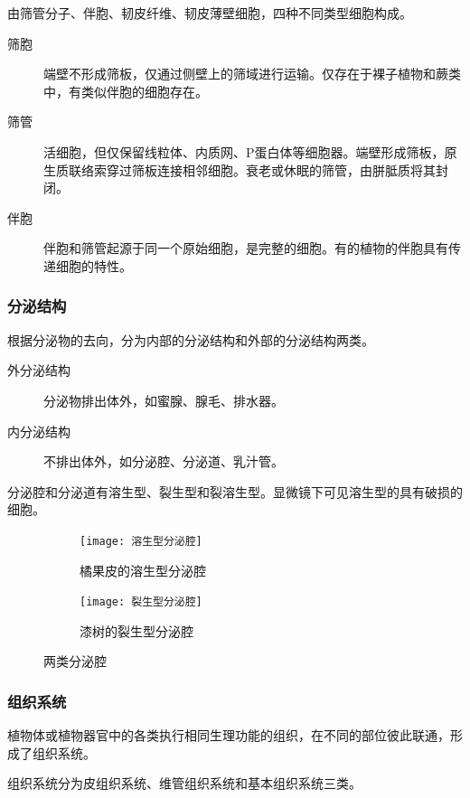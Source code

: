 由筛管分子、伴胞、韧皮纤维、韧皮薄壁细胞，四种不同类型细胞构成。

\begin{description}
	\item[筛胞] 端壁不形成筛板，仅通过侧壁上的筛域进行运输。仅存在于裸子植物和蕨类中，有类似伴胞的细胞存在。
	\item[筛管] 活细胞，但仅保留线粒体、内质网、P蛋白体等细胞器。端壁形成筛板，原生质联络索穿过筛板连接相邻细胞。衰老或休眠的筛管，由胼胝质将其封闭。
	\item[伴胞] 伴胞和筛管起源于同一个原始细胞，是完整的细胞。有的植物的伴胞具有传递细胞的特性。
\end{description}

\subsubsection{分泌结构}

根据分泌物的去向，分为内部的分泌结构和外部的分泌结构两类。

\begin{description}
	\item[外分泌结构] 分泌物排出体外，如蜜腺、腺毛、排水器。
	\item[内分泌结构] 不排出体外，如分泌腔、分泌道、乳汁管。
\end{description}

分泌腔和分泌道有溶生型、裂生型和裂溶生型。显微镜下可见溶生型的具有破损的细胞。

\begin{figure}[htbp]
	\centering
	\begin{subfigure}{0.45\textwidth}
		\texttt{[image: 溶生型分泌腔]}
		\caption{橘果皮的溶生型分泌腔}
	\end{subfigure}
	\hfill
	\begin{subfigure}{0.45\textwidth}
		\texttt{[image: 裂生型分泌腔]}
		\caption{漆树的裂生型分泌腔}
	\end{subfigure}
	\caption{两类分泌腔}
	\label{fig:两种不同的分泌腔}
\end{figure}

\subsubsection{组织系统}

植物体或植物器官中的各类执行相同生理功能的组织，在不同的部位彼此联通，形成了组织系统。

组织系统分为皮组织系统、维管组织系统和基本组织系统三类。

